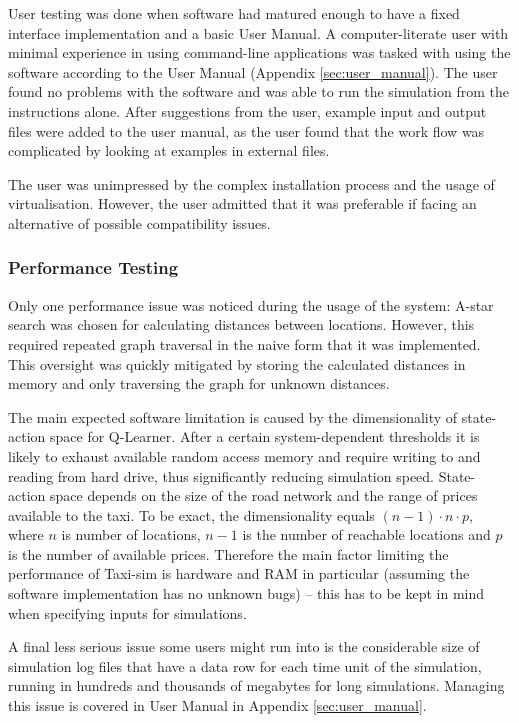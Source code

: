 User testing was done when software had matured enough to have a fixed
interface implementation and a basic User Manual. A computer-literate user with
minimal experience in using command-line applications was tasked with using the
software according to the User Manual (Appendix \ref{sec:user_manual}). The
user found no problems with the software and was able to run the simulation
from the instructions alone. After suggestions from the user, example input and
output files were added to the user manual, as the user found that the work
flow was complicated by looking at examples in external files.

The user was unimpressed by the complex installation process and the usage of
virtualisation. However, the user admitted that it was preferable if facing an
alternative of possible compatibility issues.

\subsubsection{Performance Testing}
\label{sec:implementation:testing:performance}

Only one performance issue was noticed during the usage of the system: A-star
search was chosen for calculating distances between locations. However, this
required repeated graph traversal in the naive form that it was implemented.
This oversight was quickly mitigated by storing the calculated distances in
memory and only traversing the graph for unknown distances.

The main expected software limitation is caused by the dimensionality of state-
action space for Q-Learner. After a certain system-dependent thresholds it is
likely to exhaust available random access memory and require writing to and
reading from hard drive, thus significantly reducing simulation speed. State-
action space depends on the size of the road network and the range of prices
available to the taxi. To be exact, the dimensionality equals \( (n-1) \cdot n
\cdot p\), where \(n\) is number of locations, \(n-1\) is the number of
reachable locations and \(p\) is the number of available prices. Therefore the
main factor limiting the performance of Taxi-sim is hardware and RAM in
particular (assuming the software implementation has no unknown bugs) -- this
has to be kept in mind when specifying inputs for simulations.

A final less serious issue some users might run into is the considerable size
of simulation log files that have a data row for each time unit of the
simulation, running in hundreds and thousands of megabytes for long
simulations. Managing this issue is covered in User Manual in Appendix
\ref{sec:user_manual}.
